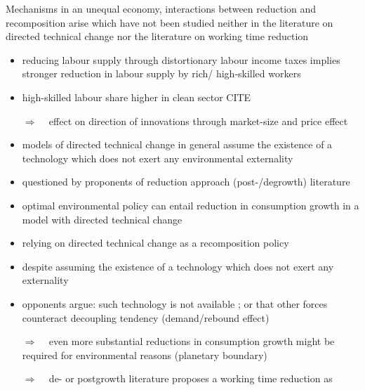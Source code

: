\documentclass[11pt,aspectratio=169]{beamer}
\newcommand{\ar}{$\Rightarrow$ \ }
\begin{document}
\begin{frame}{Mechanisms}
 in an unequal economy, interactions between reduction and recomposition arise which have not been studied neither in the literature on directed technical change nor the literature on working time reduction
\begin{itemize}
	\item reducing labour supply through distortionary labour income taxes implies stronger reduction in labour supply by rich/ high-skilled workers
	\item high-skilled labour share higher in clean sector CITE
	\item[\ar] effect on direction of innovations through market-size and  price effect
\end{itemize}
\begin{itemize}
\item models of directed technical change in general assume the existence of a technology which does not exert any environmental externality
\item questioned by proponents of reduction approach (post-/degrowth) literature
\end{itemize}
\begin{itemize}
\item optimal environmental policy can entail reduction in consumption growth  \citep[e.g.,][]{Acemoglu2012TheChange} in a model with directed technical change
\item relying on directed technical change as a recomposition policy
\item despite assuming the existence of a technology which does not exert any externality
\item opponents argue: such technology is not available \citep{Dasgupta2021}; or that other forces counteract decoupling tendency (demand/rebound effect)
\item[\ar] even more substantial reductions in consumption growth might be required for environmental reasons (planetary boundary)
\item[\ar] de- or postgrowth literature proposes a working time reduction as  
\end{itemize}
\end{frame}
\end{document}
